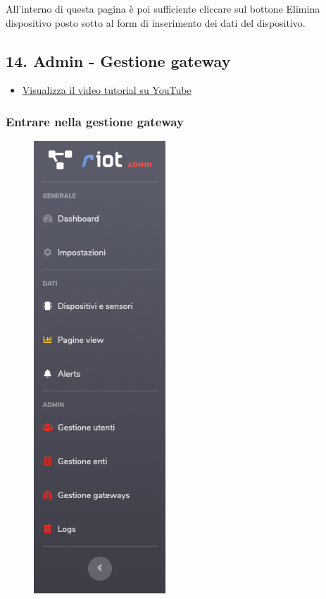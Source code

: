 		All'interno di questa pagina è poi sufficiente cliccare sul bottone Elimina dispositivo posto sotto al form di inserimento dei dati del dispositivo.

\newpage \subsection{14. Admin - Gestione gateway}
	
	\begin{itemize}
		\item \href{https://www.youtube.com/watch?v=PjySMOLCtMA&list=PLPKYjnuIh1FA3b3jn_bwY_ztYzaFn2mIT&index=17}{Visualizza il video tutorial su YouTube} 
	\end{itemize}

	\subsubsection{Entrare nella gestione gateway}

		\begin{figure}[H]
		\centering
		\includegraphics[scale=0.600]{res/images/admin/menuGateway.png}
		\caption{}
	\end{figure}

